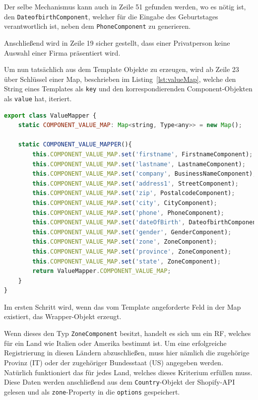 Der selbe Mechanismus kann auch in Zeile 51 gefunden werden, wo es nötig ist, den \texttt{DateofbirthComponent}, welcher für die Eingabe des Geburtstages verantwortlich ist, neben dem \texttt{PhoneComponent} zu generieren.

Anschließend wird in Zeile 19 sicher gestellt, dass einer Privatperson keine Auswahl einer Firma präsentiert wird.

Um nun tatsächlich aus dem Template Objekte zu erzeugen, wird ab Zeile 23 über Schlüssel einer Map, beschrieben im Listing~\ref{lst:valueMap}, welche den String eines Templates als \texttt{key} und den korrespondierenden Component-Objekten als \texttt{value} hat, iteriert. 

\begin{lstlisting}[caption={valueMap in der \texttt{analyzeRow()}-Methode}, language=JavaScript,label={lst:valueMap}]
export class ValueMapper {
	static COMPONENT_VALUE_MAP: Map<string, Type<any>> = new Map();
	
	static COMPONENT_VALUE_MAPPER(){
		this.COMPONENT_VALUE_MAP.set('firstname', FirstnameComponent);
		this.COMPONENT_VALUE_MAP.set('lastname', LastnameComponent);
		this.COMPONENT_VALUE_MAP.set('company', BusinessNameComponent);
		this.COMPONENT_VALUE_MAP.set('address1', StreetComponent);
		this.COMPONENT_VALUE_MAP.set('zip', PostalcodeComponent);
		this.COMPONENT_VALUE_MAP.set('city', CityComponent);
		this.COMPONENT_VALUE_MAP.set('phone', PhoneComponent);
		this.COMPONENT_VALUE_MAP.set('dateOfBirth', DateofbirthComponent);
		this.COMPONENT_VALUE_MAP.set('gender', GenderComponent);
		this.COMPONENT_VALUE_MAP.set('zone', ZoneComponent);
		this.COMPONENT_VALUE_MAP.set('province', ZoneComponent);
		this.COMPONENT_VALUE_MAP.set('state', ZoneComponent);
		return ValueMapper.COMPONENT_VALUE_MAP;
	}
}
\end{lstlisting}

Im ersten Schritt wird, wenn das vom Template angeforderte Feld in der Map existiert, das Wrapper-Objekt erzeugt. 

Wenn dieses den Typ \texttt{ZoneComponent} besitzt, handelt es sich um ein RF, welches für ein Land wie Italien oder Amerika bestimmt ist. Um eine erfolgreiche Registrierung in diesen Ländern abzuschließen, muss hier nämlich die zugehörige Provinz (IT) oder der zugehöriger Bundesstaat (US) angegeben werden. Natürlich funktioniert das für jedes Land, welches dieses Kriterium erfüllen muss. Diese Daten werden anschließend aus dem \texttt{Country}-Objekt der Shopify-API gelesen und als \texttt{zone}-Property in die \texttt{options} gespeichert. 

